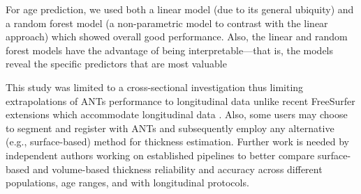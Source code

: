For age prediction,
we used both a linear model (due to its general ubiquity) and a random
forest model (a non-parametric model to contrast with the linear approach)
which showed overall good performance.  Also, the linear  and
random forest models have the advantage of being
interpretable---that is, the models reveal the specific predictors
that are most valuable  
{}



This study was limited to a cross-sectional investigation thus limiting
extrapolations of ANTs performance to longitudinal data unlike
recent FreeSurfer extensions which accommodate longitudinal data \citep{reuter2012,jovicich2013}.  
Also, some users may choose to segment and register
with ANTs and subsequently employ any alternative (e.g., surface-based)
method for thickness estimation.  Further work is needed by
independent authors working on established pipelines 
to better compare surface-based and volume-based thickness reliability
and accuracy across different populations, age ranges, and with 
longitudinal protocols. 

